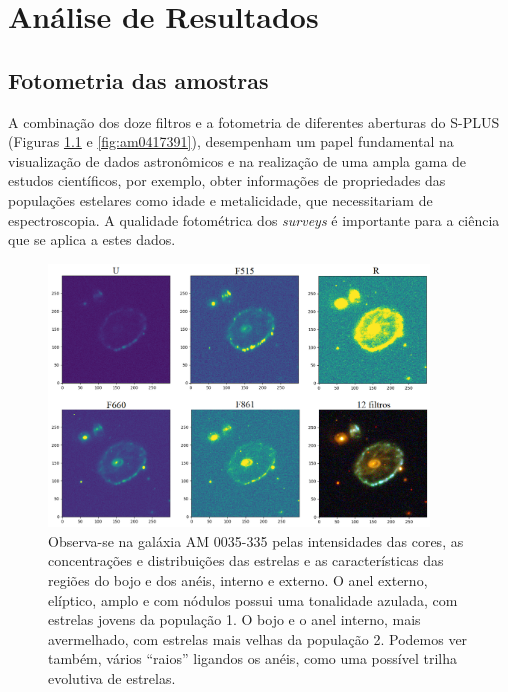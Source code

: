 \chapter{Análise de Resultados}
\label{chap:analise}

\section{Fotometria das amostras}

A combinação dos doze filtros e a fotometria de diferentes aberturas do S-PLUS (Figuras \ref{fig:filtroscartwheel} e \ref {fig:am0417391}), desempenham um papel fundamental na visualização de dados astronômicos e na realização de uma ampla gama de estudos científicos, por exemplo, obter informações de propriedades das populações estelares como idade e metalicidade, que necessitariam de espectroscopia. A qualidade fotométrica dos \emph{surveys} é importante para a ciência que se aplica a estes dados.

\begin{figure}[!h]
    \centering 
    \includegraphics[width=0.9\textwidth]{Imagens/filtroscartwheel.png} 
    \caption[Filtros individuais e combinados de AM 0035-335.]{Observa-se na galáxia AM 0035-335 pelas intensidades das cores, as concentrações e distribuições das estrelas e as características das regiões do bojo e dos anéis, interno e externo. O anel externo, elíptico, amplo e com nódulos possui uma tonalidade azulada, com estrelas jovens da população 1. O bojo e o anel interno, mais avermelhado, com estrelas mais velhas da população 2. Podemos ver também, vários ``raios'' ligandos os anéis, como uma possível trilha evolutiva de estrelas.}
    \label{fig:filtroscartwheel} 
\end{figure}

